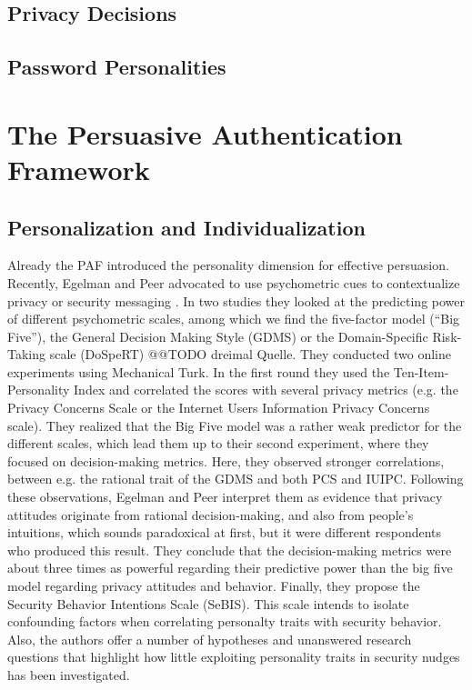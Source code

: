 	\subsection{Privacy Decisions}
	\subsection{Password Personalities}

\section{The Persuasive Authentication Framework}


\subsection{Personalization and Individualization}
Already the PAF introduced the personality dimension for effective persuasion. Recently, Egelman and Peer advocated to use psychometric cues to contextualize privacy or security messaging \cite{Egelman2015AverageUser}. In two studies they looked at the predicting power of different psychometric scales, among which we find the five-factor model (``Big Five''), the General Decision Making Style (GDMS) or the Domain-Specific Risk-Taking scale (DoSpeRT) @@TODO dreimal Quelle. They conducted two online experiments using Mechanical Turk. In the first round they used the Ten-Item-Personality Index and correlated the scores with several privacy metrics (e.g. the Privacy Concerns Scale or the Internet Users Information Privacy Concerns scale). They realized that the Big Five model was a rather weak predictor for the different scales, which lead them up to their second experiment, where they focused on decision-making metrics. Here, they observed stronger correlations, between e.g. the rational trait of the GDMS and both PCS and IUIPC. Following these observations, Egelman and Peer interpret them as evidence that privacy attitudes originate from rational decision-making, and also from people's intuitions, which sounds paradoxical at first, but it were different respondents who produced this result. They conclude that the decision-making metrics were about three times as powerful regarding their predictive power than the big five model regarding privacy attitudes and behavior. Finally, they propose the Security Behavior Intentions Scale (SeBIS). This scale intends to isolate confounding factors when correlating personalty traits with security behavior. Also, the authors offer a number of hypotheses and unanswered research questions that highlight how little exploiting personality traits in security nudges has been investigated. 


